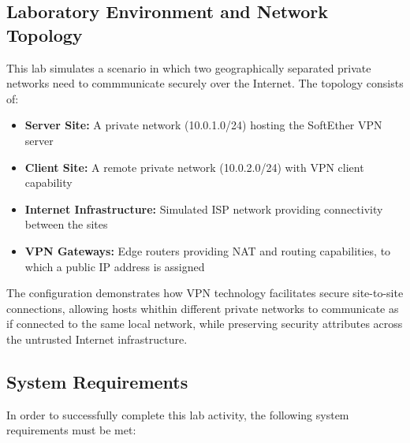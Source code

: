 \subsection{Laboratory Environment and Network Topology}

This lab simulates a scenario in which two geographically separated private networks need to commmunicate securely over the Internet. The topology consists of:

\begin{itemize}
    \item \textbf{Server Site:} A private network (10.0.1.0/24) hosting the SoftEther VPN server
    \item \textbf{Client Site:} A remote private network (10.0.2.0/24) with VPN client capability
    \item \textbf{Internet Infrastructure:} Simulated ISP network providing connectivity between the sites
    \item \textbf{VPN Gateways:} Edge routers providing NAT and routing capabilities, to which a public IP address is assigned
\end{itemize}

\noindent
The configuration demonstrates how VPN technology facilitates secure site-to-site connections, allowing hosts whithin different private networks to communicate as if connected to the same local network, while preserving security attributes across the untrusted Internet infrastructure.

\subsection{System Requirements}

In order to successfully complete this lab activity, the following system requirements must be met:

